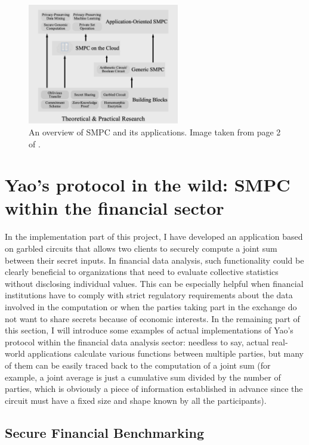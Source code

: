\documentclass[12pt]{article}
\begin{document}
\begin{figure}[h]
    \centering
    \includegraphics[width=0.59\textwidth]{practicalapplications.png}
    \caption{An overview of SMPC and its applications. Image taken from page 2 of \cite{Applications}.}\label{fig:applications}
\end{figure}

\section{Yao's protocol in the wild: SMPC within the financial sector}\label{sec:applications}

In the implementation part of this project, I have developed an application based on garbled circuits that allows two clients to securely compute a joint sum between their secret inputs. In financial data analysis, such functionality could be clearly beneficial to organizations that need to evaluate collective statistics without disclosing individual values. This can be especially helpful when financial institutions have to comply with strict regulatory requirements about the data involved in the computation or when the parties taking part in the exchange do not want to share secrets because of economic interests. In the remaining part of this section, I will introduce some examples of actual implementations of Yao's protocol within the financial data analysis sector: needless to say, actual real-world applications calculate various functions between multiple parties, but many of them can be easily traced back to the computation of a joint sum (for example, a joint average is just a cumulative sum divided by the number of parties, which is obviously a piece of information established in advance since the circuit must have a fixed size and shape known by all the participants).

\subsection{Secure Financial Benchmarking}
\end{document}

